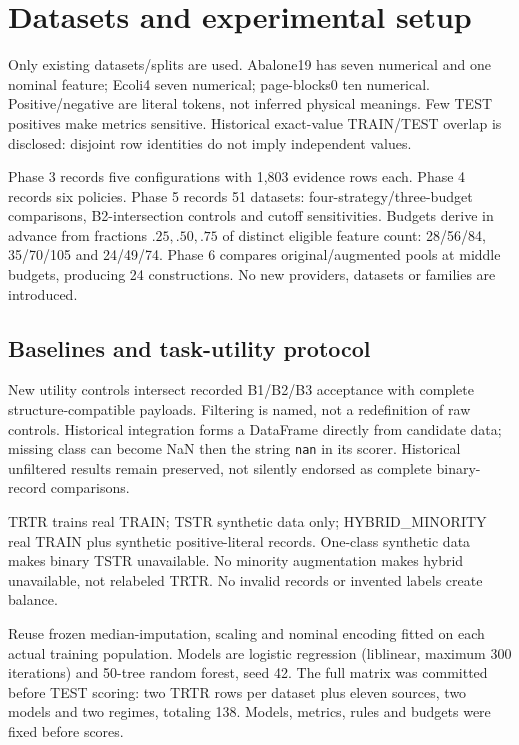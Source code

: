 \section{Datasets and experimental setup}

Only existing datasets/splits are used. Abalone19 has seven numerical and one nominal feature; Ecoli4 seven numerical; page-blocks0 ten numerical. Positive/negative are literal tokens, not inferred physical meanings. Few TEST positives make metrics sensitive. Historical exact-value TRAIN/TEST overlap is disclosed: disjoint row identities do not imply independent values.

Phase 3 records five configurations with 1,803 evidence rows each. Phase 4 records six policies. Phase 5 records 51 datasets: four-strategy/three-budget comparisons, B2-intersection controls and cutoff sensitivities. Budgets derive in advance from fractions $.25,.50,.75$ of distinct eligible feature count: 28/56/84, 35/70/105 and 24/49/74. Phase 6 compares original/augmented pools at middle budgets, producing 24 constructions. No new providers, datasets or families are introduced.

\subsection{Baselines and task-utility protocol}

New utility controls intersect recorded B1/B2/B3 acceptance with complete structure-compatible payloads. Filtering is named, not a redefinition of raw controls. Historical integration forms a DataFrame directly from candidate data; missing class can become NaN then the string \texttt{nan} in its scorer. Historical unfiltered results remain preserved, not silently endorsed as complete binary-record comparisons.

TRTR trains real TRAIN; TSTR synthetic data only; HYBRID\_MINORITY real TRAIN plus synthetic positive-literal records. One-class synthetic data makes binary TSTR unavailable. No minority augmentation makes hybrid unavailable, not relabeled TRTR. No invalid records or invented labels create balance.

Reuse frozen median-imputation, scaling and nominal encoding fitted on each actual training population. Models are logistic regression (liblinear, maximum 300 iterations) and 50-tree random forest, seed 42. The full matrix was committed before TEST scoring: two TRTR rows per dataset plus eleven sources, two models and two regimes, totaling 138. Models, metrics, rules and budgets were fixed before scores.

